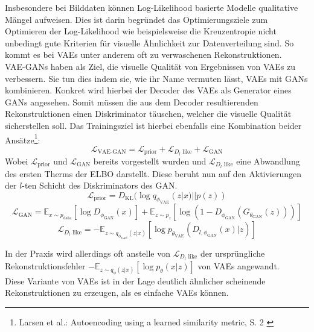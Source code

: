 Insbesondere bei Bilddaten können Log-Likelihood basierte Modelle qualitative Mängel aufweisen. Dies ist darin begründet das Optimierungsziele zum Optimieren der Log-Likelihood wie beispielsweise die Kreuzentropie nicht unbedingt gute Kriterien für visuelle Ähnlichkeit zur Datenverteilung sind. So kommt es bei VAEs unter anderem oft zu verwaschenen Rekonstruktionen. \\
VAE-GANs haben als Ziel, die visuelle Qualität von Ergebnissen von VAEs zu verbessern. Sie tun dies indem sie, wie ihr Name vermuten lässt, VAEs mit GANs kombinieren. Konkret wird hierbei der Decoder des VAEs als Generator eines GANs angesehen. Somit müssen die aus dem Decoder resultierenden Rekonstruktionen einen Diskriminator täuschen, welcher die visuelle Qualität sicherstellen soll. Das Trainingsziel ist hierbei ebenfalls eine Kombination beider Ansätze\footnote{
    Larsen et al.: Autoencoding using a learned similarity metric, S. 2
    \cite{larsen2016autoencoding}
}:
\begin{equation}
    \mathcal L_\text{VAE-GAN}
    = \mathcal L_\text{prior} + \mathcal L_{D_l\text{ like}} + \mathcal L_\text{GAN}
\end{equation}
Wobei $\mathcal L_\text{prior}$ und $\mathcal L_\text{GAN}$ bereits vorgestellt wurden und $\mathcal L_{D_l\text{ like}}$ eine Abwandlung des ersten Therms der ELBO darstellt. Diese beruht nun auf den Aktivierungen der $l$-ten Schicht des Diskriminators des GAN. 
\begin{equation}
    \mathcal L_\text{prior} 
    = D_\text{KL} (\log q_{\phi_\text{VAE}}(z|x) || p(z))
\end{equation}
\begin{equation}
    \mathcal L_\text{GAN} = \mathbb E_{x \sim p_\text{data}}[\log D_{\phi_\text{GAN}}(x)] 
    + \mathbb E_{z \sim p_z}
    [\log (1 - D_{\phi_\text{GAN}}(G_{\theta_\text{GAN}}(z)))]
\end{equation}
\begin{equation}
    \mathcal L_{D_l\text{ like}} = 
    - \mathbb E_{z \sim q_{\phi_\text{VAE}}(z|x)}
    \left [
        \log p_{\theta_\text{VAE}}(D_{l, \phi_\text{GAN}}(x)|z)
    \right ]
\end{equation}

In der Praxis wird allerdings oft anstelle von $\mathcal L_{D_l\text{ like}}$ der ursprüngliche Rekonstruktionsfehler $- \mathbb E_{z \sim q_{\phi}(z|x)}
    \left [
        \log p_\theta(x|z)
    \right ]$ von VAEs angewandt. \\
Diese Variante von VAEs ist in der Lage deutlich ähnlicher scheinende Rekonstruktionen zu erzeugen, als es einfache VAEs können.


